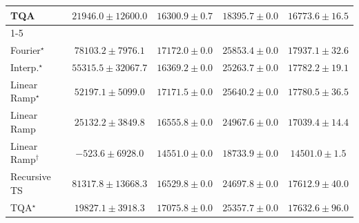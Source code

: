 \begin{tabular}{l|cccc|}
TQA & {\cellcolor[HTML]{FEDD84}} \color[HTML]{000000} $21946.0\pm 12600.0$ & {\cellcolor[HTML]{FEEAA1}} \color[HTML]{000000} $16300.9\pm 0.7$ & {\cellcolor[HTML]{FEE697}} \color[HTML]{000000} $18395.7\pm 0.0$ & {\cellcolor[HTML]{FEE99E}} \color[HTML]{000000} $16773.6\pm 16.5$ \\
\cline{1-5}
\multicolumn{5}{c}{\rule{0pt}{8pt}PP} \\
\midrule
Fourier$^\star$ & {\cellcolor[HTML]{00502D}} \color[HTML]{F1F1F1} $78103.2\pm 7976.1$ & {\cellcolor[HTML]{E1F3A9}} \color[HTML]{000000} $17172.0\pm 0.0$ & {\cellcolor[HTML]{C0E597}} \color[HTML]{000000} $25853.4\pm 0.0$ & {\cellcolor[HTML]{DFF3A8}} \color[HTML]{000000} $17937.1\pm 32.6$ \\
Interp.$^\star$ & {\cellcolor[HTML]{339951}} \color[HTML]{F1F1F1} $55315.5\pm 32067.7$ & {\cellcolor[HTML]{E4F4AB}} \color[HTML]{000000} $16369.2\pm 0.0$ & {\cellcolor[HTML]{C3E698}} \color[HTML]{000000} $25263.7\pm 0.0$ & {\cellcolor[HTML]{DFF3A8}} \color[HTML]{000000} $17782.2\pm 19.1$ \\
Linear Ramp$^\star$ & {\cellcolor[HTML]{3DA559}} \color[HTML]{F1F1F1} $52197.1\pm 5099.0$ & {\cellcolor[HTML]{E1F3A9}} \color[HTML]{000000} $17171.5\pm 0.0$ & {\cellcolor[HTML]{C1E698}} \color[HTML]{000000} $25640.2\pm 0.0$ & {\cellcolor[HTML]{DFF3A8}} \color[HTML]{000000} $17780.5\pm 36.5$ \\
Linear Ramp & {\cellcolor[HTML]{C3E698}} \color[HTML]{000000} $25132.2\pm 3849.8$ & {\cellcolor[HTML]{E3F4AA}} \color[HTML]{000000} $16555.8\pm 0.0$ & {\cellcolor[HTML]{C4E799}} \color[HTML]{000000} $24967.6\pm 0.0$ & {\cellcolor[HTML]{E2F4AA}} \color[HTML]{000000} $17039.4\pm 14.4$ \\
Linear Ramp$^\dagger$ & {\cellcolor[HTML]{FFFFE5}} \color[HTML]{000000} $-523.6\pm 6928.0$ & {\cellcolor[HTML]{E9F6AF}} \color[HTML]{000000} $14551.0\pm 0.0$ & {\cellcolor[HTML]{DDF1A6}} \color[HTML]{000000} $18733.9\pm 0.0$ & {\cellcolor[HTML]{EAF7AF}} \color[HTML]{000000} $14501.0\pm 1.5$ \\
Recursive TS & {\cellcolor[HTML]{004529}} \color[HTML]{F1F1F1} $81317.8\pm 13668.3$ & {\cellcolor[HTML]{E3F4AA}} \color[HTML]{000000} $16529.8\pm 0.0$ & {\cellcolor[HTML]{C5E89A}} \color[HTML]{000000} $24697.8\pm 0.0$ & {\cellcolor[HTML]{E0F3A8}} \color[HTML]{000000} $17612.9\pm 40.0$ \\
TQA$^\star$ & {\cellcolor[HTML]{DAF0A4}} \color[HTML]{000000} $19827.1\pm 3918.3$ & {\cellcolor[HTML]{E1F3A9}} \color[HTML]{000000} $17075.8\pm 0.0$ & {\cellcolor[HTML]{C3E698}} \color[HTML]{000000} $25357.7\pm 0.0$ & {\cellcolor[HTML]{E0F3A8}} \color[HTML]{000000} $17632.6\pm 96.0$ \\

\end{tabular}
